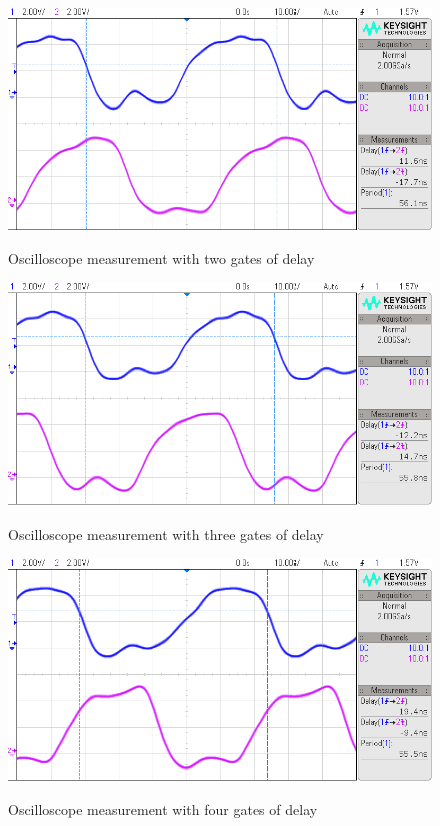 \documentclass[CMPE]{KGCOEReport}
\begin{document}
\begin{figure}[H]
\includegraphics[width=\textwidth]{fig2}
\label{fig:osc-2}
\caption{Oscilloscope measurement with two gates of delay} 
\end{figure}

\begin{figure}[H]
\includegraphics[width=\textwidth]{fig3}
\label{fig:osc-3}
\caption{Oscilloscope measurement with three gates of delay} 
\end{figure}

\begin{figure}[H]
\includegraphics[width=\textwidth]{fig4}
\label{fig:osc-4}
\caption{Oscilloscope measurement with four gates of delay} 
\end{figure}
\end{document}
